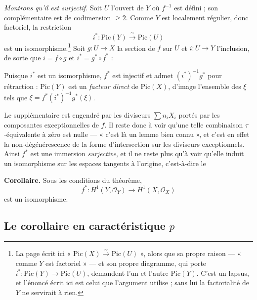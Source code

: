 \documentclass[11pt,a4paper]{article}
\begin{document}
\emph{Montrons qu'il est surjectif.} Soit $U$ l'ouvert de $Y$ où $f^{-1}$ est
défini ; son complémentaire est de codimension $\geqslant 2$. Comme $Y$ est
localement régulier, donc factoriel, la restriction
\[
  i^{*} : \mathrm{Pic}(Y) \xrightarrow{\ \sim\ } \mathrm{Pic}(U)
\]
est un isomorphisme.\footnote{La page écrit ici
« $\mathrm{Pic}(X) \xrightarrow{\ \sim\ } \mathrm{Pic}(U)$ », alors que sa
propre raison --- « comme $Y$ est factoriel » --- et son propre diagramme,
qui porte $i^{*} : \mathrm{Pic}(Y) \to \mathrm{Pic}(U)$, demandent l'un et
l'autre $\mathrm{Pic}(Y)$. C'est un lapsus, et l'énoncé écrit ici est celui que
l'argument utilise ; sans lui la factorialité de $Y$ ne servirait à rien.}
Soit $g : U \to X$ la section de $f$ sur $U$ et $i : U \to Y$ l'inclusion, de
sorte que $i = f \circ g$ et $i^{*} = g^{*} \circ f^{*}$ :



Puisque $i^{*}$ est un isomorphisme, $f^{*}$ est injectif et admet
$(i^{*})^{-1} g^{*}$ pour rétraction : $\mathrm{Pic}(Y)$ est un
\emph{facteur direct} de $\mathrm{Pic}(X)$, d'image l'ensemble des $\xi$ tels
que $\xi = f^{*}(i^{*})^{-1}g^{*}(\xi)$.

Le supplémentaire est engendré par les diviseurs $\sum n_{i} X_{i}$ portés par
les composantes exceptionnelles de $f$. Il reste donc à voir qu'une telle
combinaison $\tau$-équivalente à zéro est nulle --- « c'est là un lemme bien
connu », et c'est en effet la non-dégénérescence de la forme d'intersection sur
les diviseurs exceptionnels. Ainsi $f^{*}$ est une immersion \emph{surjective},
et il ne reste plus qu'à voir qu'elle induit un isomorphisme sur les espaces
tangents à l'origine, c'est-à-dire le

\textbf{Corollaire.} Sous les conditions du théorème,
\[
  f^{*} : H^{1}(Y, \mathcal{O}_{Y}) \longrightarrow H^{1}(X, \mathcal{O}_{X})
\]
est un isomorphisme.

\subsection*{Le corollaire en caractéristique $p$}
\end{document}
